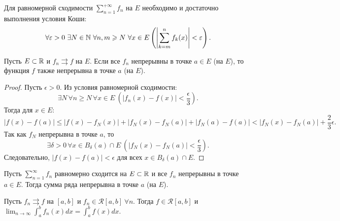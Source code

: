 \begin{corollary}
    Для равномерной сходимости $\sum_{n = 1}^{+\infty}f_{n}$ на $E$ необходимо и достаточно выполнения условия Коши:
    \[\forall \epsilon > 0 \ \exists N \in \N \ \forall n, m \geq N \ \forall x \in E \left(\left|\sum_{k = m}^{n}f_{k}(x)\right| < \epsilon\right).\]
\end{corollary}

\begin{theorem}
    \label{limit-fun-cont}
    Пусть $E \subset \mathbb{R}$ и $f_{n} \rightrightarrows f$ на $E$. Если все $f_{n}$ непрерывны в точке $a \in E$ (на $E$), то функция $f$ также непрерывна в точке $a$ (на $E$).
\end{theorem}

\begin{proof}
    Пусть $\epsilon > 0$. Из условия равномерной сходимости:
    \[\exists N \, \forall n \ge N \, \forall x \in E \ \left(|f_n(x) - f(x)| < \frac{\epsilon}{3}\right).\]
    Тогда для $x \in E$:
    \[|f(x) - f(a)| \le |f(x) - f_N(x)| + |f_N(x) - f_N(a)| + |f_N(a) - f(a)| < |f_N(x) - f_N(a)| + \frac{2}{3}\epsilon.\]
    Так как $f_N$ непрерывна в точке $a$, то
    \[\exists \delta > 0 \, \forall x \in B_\delta(a) \cap E \ \left(|f_N(x) - f_N(a)| < \frac{\epsilon}{3}\right).\]
    Следовательно, $|f(x) - f(a)| < \epsilon$ для всех $x \in B_\delta(a) \cap E$.
\end{proof}

\begin{corollary}
    \label{ser-sum-continuity}
    Пусть $\sum_{n = 1}^{\infty}f_{n}$ равномерно сходится на $E \subset \mathbb{R}$ и все $f_{n}$ непрерывны в точке $a \in E$. Тогда сумма ряда непрерывна в точке $a$ (на $E$).
\end{corollary}

\begin{theorem}
    \label{limit-int}
    Пусть $f_{n} \rightrightarrows f$ на $[a, b]$ и $f_{n} \in \mathcal{R}[a, b] \ \forall n$. Тогда $f \in \mathcal{R}[a, b]$ и $\lim_{n \to \infty}\int_{a}^{b} f_{n}(x) dx = \int_{a}^{b} f(x) dx$.
\end{theorem}

